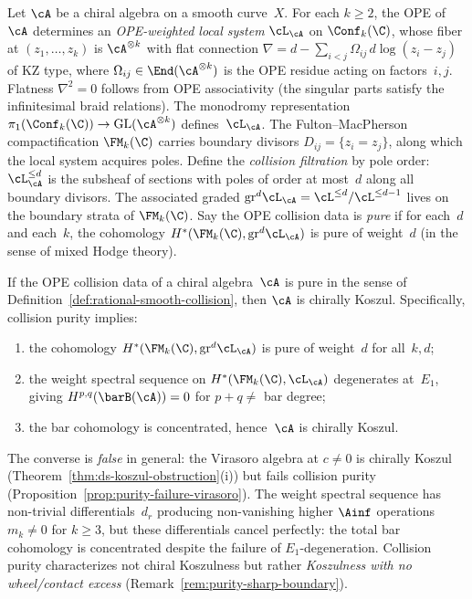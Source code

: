 \begin{definition}
\label{def:rational-smooth-collision}
Let $\cA$ be a chiral algebra on a smooth curve~$X$. For each
$k \geq 2$, the OPE of~$\cA$ determines an \emph{OPE-weighted
local system} $\cL_{\cA}$ on $\Conf_k(\C)$, whose fiber at
$(z_1,\ldots,z_k)$ is $\cA^{\otimes k}$ with flat connection
$\nabla = d - \sum_{i<j} \Omega_{ij}\, d\log(z_i - z_j)$
of KZ type, where $\Omega_{ij} \in \End(\cA^{\otimes k})$ is
the OPE residue acting on factors~$i,j$. Flatness
$\nabla^2 = 0$ follows from OPE associativity
(the singular parts satisfy the infinitesimal braid relations).
The monodromy representation $\pi_1(\Conf_k(\C)) \to
\mathrm{GL}(\cA^{\otimes k})$ defines~$\cL_{\cA}$. The Fulton--MacPherson
compactification $\FM_k(\C)$ carries boundary divisors
$D_{ij} = \{z_i = z_j\}$, along which the local system acquires
poles. Define the \emph{collision filtration} by pole order:
$\cL^{\leq d}_{\cA}$ is the subsheaf of sections with poles of
order at most~$d$ along all boundary divisors. The associated
graded $\mathrm{gr}^d\cL_{\cA} = \cL^{\leq d}/\cL^{\leq d-1}$
lives on the boundary strata of $\FM_k(\C)$.
Say the OPE collision data is \emph{pure} if for each~$d$ and
each~$k$, the cohomology $H^*(\FM_k(\C), \mathrm{gr}^d\cL_{\cA})$
is pure of weight~$d$ (in the sense of mixed Hodge theory).
\end{definition}

\begin{proposition}
\label{prop:purity-koszul}
\label{prop:collision-purity-implies-koszul}
If the OPE collision data of a chiral algebra~$\cA$ is pure in the
sense of Definition~\ref{def:rational-smooth-collision}, then
$\cA$ is chirally Koszul. Specifically, collision purity implies:
\begin{enumerate}[label=\textup{(\alph*)}]
\item the cohomology $H^*(\FM_k(\C), \mathrm{gr}^d\cL_{\cA})$
 is pure of weight~$d$ for all~$k,d$;
\item the weight spectral sequence on $H^*(\FM_k(\C),
 \cL_{\cA})$ degenerates at~$E_1$, giving
 $H^{p,q}(\barB(\cA)) = 0$ for $p + q \neq$ bar degree;
\item the bar cohomology is concentrated, hence~$\cA$ is chirally
 Koszul.
\end{enumerate}
The converse is \emph{false} in general: the Virasoro algebra at
$c \neq 0$ is chirally Koszul
\textup{(}Theorem~\textup{\ref{thm:ds-koszul-obstruction}(i))} but
fails collision purity
\textup{(}Proposition~\textup{\ref{prop:purity-failure-virasoro})}.
The weight spectral sequence has non-trivial differentials~$d_r$
producing non-vanishing higher $\Ainf$ operations $m_k \neq 0$ for
$k \geq 3$, but these differentials cancel perfectly: the total
bar cohomology is concentrated despite the failure of
$E_1$-degeneration. Collision purity characterizes not chiral
Koszulness but rather \emph{Koszulness with no wheel/contact excess}
\textup{(}Remark~\textup{\ref{rem:purity-sharp-boundary})}.
\end{proposition}

